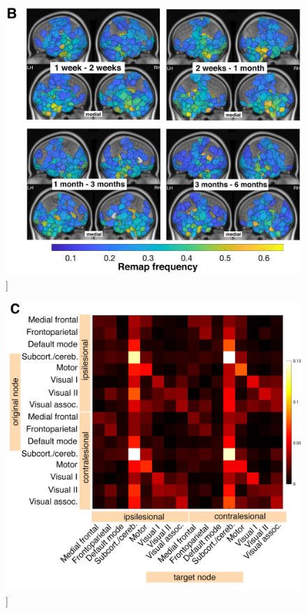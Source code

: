 \documentclass[phd,tocprelim]{cornell}
\renewcommand{\caption}[1]{\singlespacing\hangcaption{#1}\normalspacing}
\begin{document}
\clearpage
\null
\vfill
\begin{figure}[h!]
		\ContinuedFloat
		\captionsetup{labelformat=adja-page}
    \centering
    \includegraphics[width=\textwidth]{chapter1/SupplementaryFigure13B.png}
    \caption[]{}
\end{figure}
\null
\vfill
\clearpage
\null
\vfill
\begin{figure}[h!]
		\ContinuedFloat
		\captionsetup{labelformat=adja-page}
    \centering
    \includegraphics[width=\textwidth]{chapter1/SupplementaryFigure13C.png}
    \caption[]{}
\end{figure}
\end{document}
